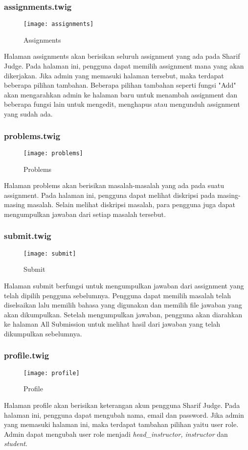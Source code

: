 \subsubsection{assignments.twig}
\begin{figure}[H]
	\centering  
	\texttt{[image: assignments]}  
	\caption[Assignments]{Assignments} 
	\label{fig:assignments} 
\end{figure} 
Halaman assignments akan berisikan seluruh assignment yang ada pada Sharif Judge. Pada halaman ini, pengguna dapat memilih assignment mana yang akan dikerjakan. Jika admin yang memasuki halaman tersebut, maka terdapat beberapa pilihan tambahan. Beberapa pilihan tambahan seperti fungsi "Add" akan mengarahkan admin ke halaman baru untuk menambah assignment dan beberapa fungsi lain untuk mengedit, menghapus atau mengunduh assignment yang sudah ada.

\subsubsection{problems.twig}
\begin{figure}[H]
	\centering  
	\texttt{[image: problems]}  
	\caption[Problems]{Problems} 
	\label{fig:problems} 
\end{figure} 
Halaman problems akan berisikan masalah-masalah yang ada pada suatu assignment. Pada halaman ini, pengguna dapat melihat diskripsi pada masing-masing masalah. Selain melihat diskripsi masalah, para pengguna juga dapat mengumpulkan jawaban dari setiap masalah tersebut.

\subsubsection{submit.twig}
\begin{figure}[H]
	\centering  
	\texttt{[image: submit]}  
	\caption[Submit]{Submit} 
	\label{fig:submit} 
\end{figure} 
Halaman submit berfungsi untuk mengumpulkan jawaban dari assignment yang telah dipilih pengguna sebelumnya. Pengguna dapat memilih masalah telah diselsaikan lalu memilih bahasa yang digunakan dan memilih file jawaban yang akan dikumpulkan. Setelah mengumpulkan jawaban, pengguna akan diarahkan ke halaman All Submission untuk melihat hasil dari jawaban yang telah dikumpulkan sebelumnya.

\subsubsection{profile.twig}
\begin{figure}[H]
	\centering  
	\texttt{[image: profile]}  
	\caption[Profile]{Profile} 
	\label{fig:profile} 
\end{figure} 
Halaman profile akan berisikan keterangan akun pengguna Sharif Judge. Pada halaman ini, pengguna dapat mengubah nama, email dan password. Jika admin yang memasuki halaman ini, maka terdapat tambahan pilihan yaitu user role. Admin dapat mengubah user role menjadi \textit{head\_instructor, instructor} dan \textit{student}.

